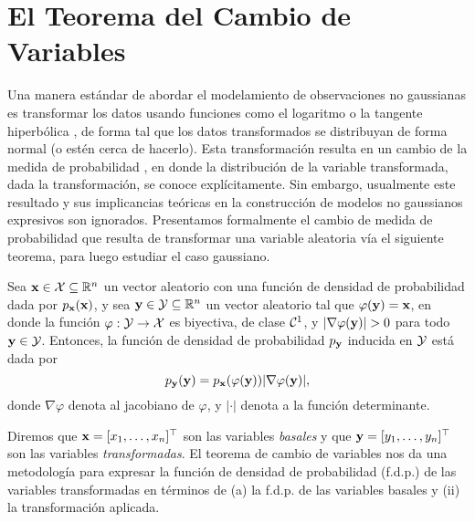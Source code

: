 \section{El Teorema del Cambio de Variables}

Una manera estándar de abordar el modelamiento de observaciones no gaussianas es transformar los datos usando funciones como el logaritmo \cite{boxcox} o la tangente hiperbólica \cite{johnsonsu}, de forma tal que los datos transformados se distribuyan de forma normal (o estén cerca de hacerlo). Esta transformación resulta en un cambio de la medida de probabilidad \cite{tao2011introduction}, en donde la distribución de la variable transformada, dada la transformación, se conoce explícitamente. Sin embargo, usualmente este resultado y sus implicancias teóricas en la construcción de modelos no gaussianos expresivos son ignorados. Presentamos formalmente el cambio de medida de probabilidad que resulta de transformar una variable aleatoria vía el siguiente teorema, para luego estudiar el caso gaussiano.

\begin{theorem}
	\label{thm:CoV}
	Sea \(\mathbf{x} \in \mathcal{X} \subseteq \mathbb{R}^{n}\) un vector aleatorio con una función de densidad de probabilidad dada por \(p_{\mathbf{x}}(\mathbf{x})\), y sea \(\mathbf{y} \in \mathcal{Y} \subseteq \mathbb{R}^n\) un vector aleatorio tal que \(\varphi(\mathbf{y}) = \mathbf{x}\), en donde la función \(\varphi : \mathcal{Y} \to \mathcal{X}\) es biyectiva, de clase \(\mathcal{C}^{1}\), y \(\vert \nabla \varphi(\mathbf{y}) \vert > 0\) para todo \(\mathbf{y} \in \mathcal{Y}\). Entonces, la función de densidad de probabilidad \(p_{\mathbf{y}}\) inducida en \(\mathcal{Y}\) está dada por
	\begin{equation*}
		p_{\mathbf{y}}(\mathbf{y}) = p_{\mathbf{x}}(\varphi(\mathbf{y})) \vert \nabla \varphi(\mathbf{y})\vert,
	\end{equation*}
	donde \(\nabla \varphi\) denota al jacobiano de \(\varphi\), y \(\vert \cdot \vert\) denota a la función determinante.
\end{theorem}

Diremos que \(\mathbf{x} = [x_{1}, \dotsc, x_{n}]^\top\) son las variables \emph{basales} y que \(\mathbf{y} = [y_{1}, \dotsc, y_{n}]^\top\) son las variables \emph{transformadas}. El teorema de cambio de variables nos da una metodología para expresar la función de densidad de probabilidad (f.d.p.) de las variables transformadas en términos de (a) la f.d.p. de las variables basales y (ii) la transformación aplicada.

